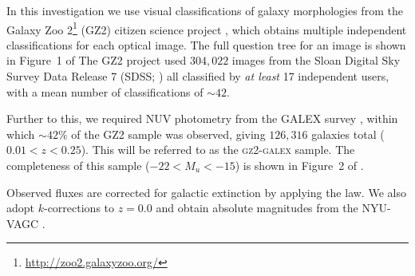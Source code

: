 \documentclass[useAMS,usenatbib]{mn2e}
\begin{document}
In this investigation we use visual classifications of galaxy morphologies from the Galaxy Zoo 2\footnote{\url{http://zoo2.galaxyzoo.org/}} (GZ2) citizen science project \citep{GZ2}, which obtains multiple independent classifications for each optical image. The full question tree for an image is shown in Figure~1 of \citeauthor{GZ2}  The GZ2 project used $304, 022$ images from the Sloan Digital Sky Survey Data Release 7 (SDSS; \citealt{york00, abazajian09}) all classified by \emph{at least} 17 independent users, with a mean number of classifications of $\sim42$.

Further to this, we required NUV photometry from the GALEX survey \citep{martin05}, within which $\sim42\%$ of the GZ2 sample was observed, giving $126, 316$ galaxies total ($0.01 < z < 0.25$). This will be referred to as the \textsc{gz2-galex} sample. The completeness of this sample ($-22 < M_u < -15$) is shown in Figure~2 of \cite{smethurst15}. 

Observed fluxes are corrected for galactic extinction \citep{Oh11} by applying the \citet{cardelli89} law. We also adopt $k$-corrections to $z = 0.0$ and obtain absolute magnitudes from the NYU-VAGC \citep{blanton05, blanton07, padmanabhan08}.

\begin{figure}
\label{fig:mosaic}
\end{figure}
\end{document}
